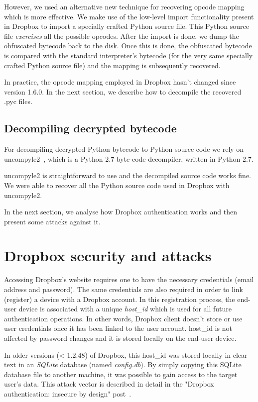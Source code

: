 \documentclass[letterpaper,twocolumn,10pt]{article}
\begin{document}
However, we used an alternative new technique for recovering opcode mapping
which is more effective. We make use of the low-level import functionality
present in Dropbox to import a specially crafted Python source file. This
Python source file \emph{exercises} all the possible opcodes. After the import
is done, we dump the obfuscated bytecode back to the disk. Once this is done,
the obfuscated bytecode is compared with the standard interpreter's bytecode
(for the very same specially crafted Python source file) and the mapping is
subsequently recovered.

In practice, the opcode mapping employed in Dropbox hasn't changed since
version 1.6.0. In the next section, we describe how to decompile the recovered
.pyc files.

\subsection{Decompiling decrypted bytecode}

For decompiling decrypted Python bytecode to Python source code we rely on
uncompyle2~\cite{uncompyle2}, which is a Python 2.7 byte-code decompiler,
written in Python 2.7.

uncompyle2 is straightforward to use and the decompiled source code works fine.
We were able to recover all the Python source code used in Dropbox with
uncompyle2.

In the next section, we analyse how Dropbox authentication works and then
present some attacks against it.

\section{Dropbox security and attacks}

Accessing Dropbox's website requires one to have the necessary credentials
(email address and password). The same credentials are also required in order
to link (register) a device with a Dropbox account. In this registration
process, the end-user device is associated with a unique \emph{host\_id} which
is used for all future authentication operations. In other words, Dropbox
client doesn't store or use user credentials once it has been linked to the
user account. host\_id is not affected by password changes and it is stored
locally on the end-user device.

In older versions (< 1.2.48) of Dropbox, this host\_id was stored locally in
clear-text in an \emph{SQLite} database (named
\emph{config.db}). By simply copying this SQLite database file to another
machine, it was possible to gain access to the target user's data. This attack
vector is described in detail in the "Dropbox authentication: insecure by design"
post~\cite{derek2011}.
\end{document}
